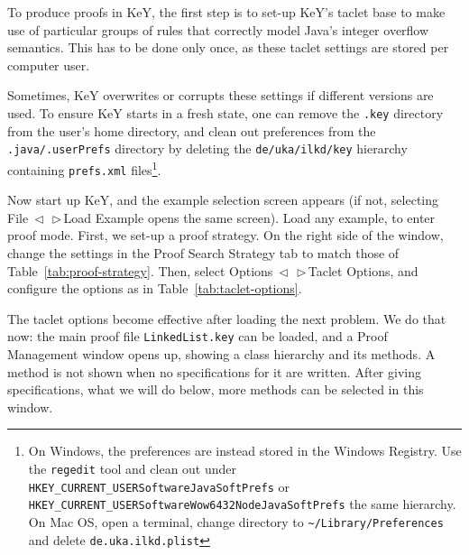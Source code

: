 \documentclass[runningheads]{llncs}
\makeatletter
\DeclareRobustCommand*{\lyxarrow}{%
\@ifstar
{\leavevmode\,$\triangleleft$\,\allowbreak}
{\leavevmode\,$\triangleright$\,\allowbreak}}
\def\bs{\char092}
\makeatother
\begin{document}
To produce proofs in KeY, the first step is to set-up KeY's taclet base to make use of particular groups of rules that correctly model Java's integer overflow semantics. This has to be done only once, as these taclet settings are stored per computer user.

Sometimes, KeY overwrites or corrupts these settings if different versions are used. To ensure KeY starts in a fresh state, one can remove the \texttt{.key} directory from the user's home directory, and clean out preferences from the \texttt{.java/.userPrefs} directory by deleting the \texttt{de/uka/ilkd/key} hierarchy containing \texttt{prefs.xml} files\footnote{On Windows, the preferences are instead stored in the Windows Registry. Use the \texttt{regedit} tool and clean out under \texttt{HKEY\_CURRENT\_USER\bs Software\bs JavaSoft\bs Prefs} or \texttt{HKEY\_CURRENT\_USER\bs Software\bs Wow6432Node\bs JavaSoft\bs Prefs} the same hierarchy. On Mac OS, open a terminal, change directory to \texttt{\textasciitilde/Library/Preferences} and delete \texttt{de.uka.ilkd.plist}}.

Now start up KeY, and the example selection screen appears (if not, selecting File\lyxarrow Load Example opens the same screen). Load any example, to enter proof mode. 
First, we set-up a proof strategy. On the right side of the window, change the settings in the Proof Search Strategy tab to match those of Table~\ref{tab:proof-strategy}. Then, select Options\lyxarrow Taclet Options, and configure the options as in Table~\ref{tab:taclet-options}.

The taclet options become effective after loading the next problem. We do that now: the main proof file \texttt{LinkedList.key} can be loaded, and a Proof Management window opens up, showing a class hierarchy and its methods. A method is not shown when no specifications for it are written. After giving specifications, what we will do below, more methods can be selected in this window.
\end{document}
